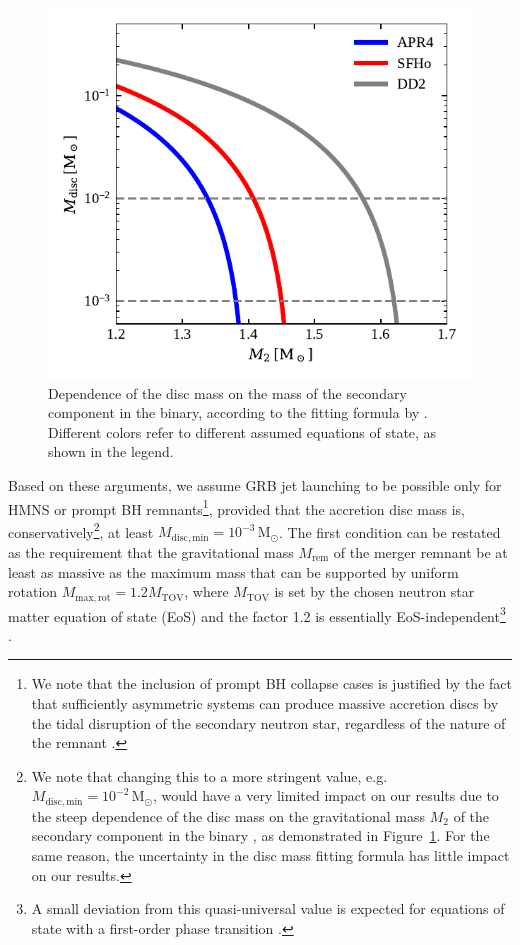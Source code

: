 \documentclass[]{aa}
\newcommand{\resp}[1]{#1}
\begin{document}
\begin{figure}
 \centering
 \includegraphics[width=\columnwidth]{figures/mdisc_m2_dependence.pdf}
 \caption{Dependence of the disc mass on the mass of the secondary component in the binary, according to the fitting formula by \cite{Kruger2020}. Different colors refer to different assumed equations of state, as shown in the legend.}
 \label{fig:mdisc_m2_dependence}
\end{figure}

Based on these arguments, we assume GRB jet launching to be possible only for HMNS or prompt BH remnants\footnote{We note that the inclusion of prompt BH collapse cases is justified by the fact that sufficiently asymmetric systems can produce massive accretion discs by the tidal disruption of the secondary neutron star, regardless of the nature of the remnant \citep{Bernuzzi2020}.}, provided that the accretion disc mass is, conservatively\footnote{We note that changing this to a more stringent value, e.g.~$M_\mathrm{disc,min}=10^{-2}\,\mathrm{M_\odot}$, would have a very limited impact on our results due to the steep dependence of the disc mass on the gravitational mass $M_2$ of the secondary component in the binary \citep{Kruger2020}, as demonstrated in Figure~\ref{fig:mdisc_m2_dependence}. For the same reason, the uncertainty in the disc mass fitting formula has little impact on our results.}, at least $M_\mathrm{disc,min}=10^{-3}\,\mathrm{M_\odot}$.  The first condition can be restated as the requirement that the gravitational mass $M_\mathrm{rem}$ of the merger remnant be at least as massive as the maximum mass that can be supported by uniform rotation $M_\mathrm{max,rot}=1.2 M_\mathrm{TOV}$, where $M_\mathrm{TOV}$ is \resp{set} by the chosen neutron star matter equation of state (EoS) and the factor 1.2 is essentially EoS-independent\footnote{A small deviation from this quasi-universal value is expected for equations of state with a first-order phase transition \citep[e.g.][]{Bozzola2019}.} \citep{Breu2016}. 
\end{document}
